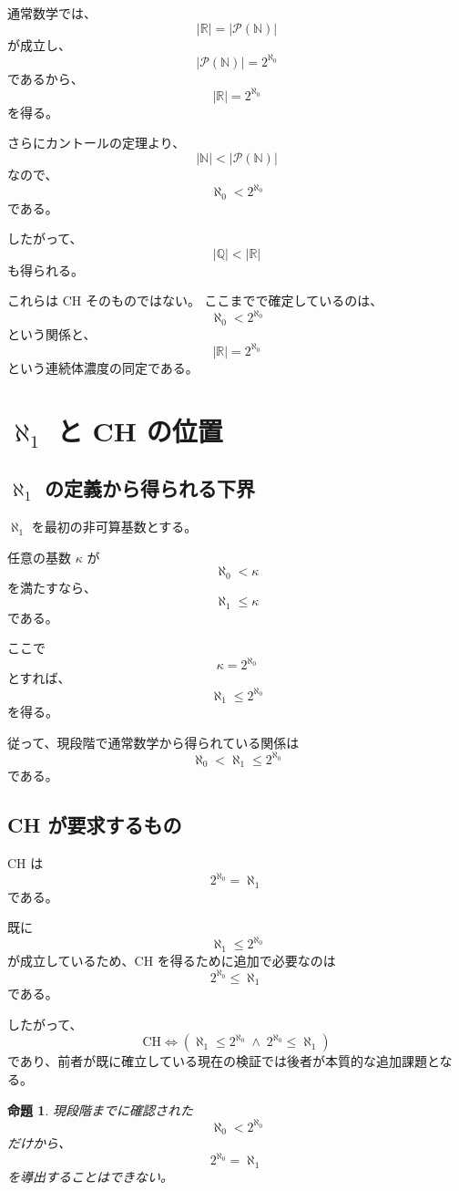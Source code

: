 \documentclass[a4paper,11pt]{article}
\newtheorem{proposition}[definition]{命題}
\newcommand{\N}{\mathbb{N}}
\newcommand{\Q}{\mathbb{Q}}
\newcommand{\R}{\mathbb{R}}
\newcommand{\Pow}{\mathcal{P}}
\begin{document}
通常数学では、
\[
|\R|=|\Pow(\N)|
\]
が成立し、
\[
|\Pow(\N)|=2^{\aleph_0}
\]
であるから、
\[
\boxed{
|\R|=2^{\aleph_0}
}
\]
を得る。

さらにカントールの定理より、
\[
|\N|<|\Pow(\N)|
\]
なので、
\[
\boxed{
\aleph_0<2^{\aleph_0}
}
\]
である。

したがって、
\[
\boxed{
|\Q|<|\R|
}
\]
も得られる。

これらは CH そのものではない。
ここまでで確定しているのは、
\[
\aleph_0<2^{\aleph_0}
\]
という関係と、
\[
|\R|=2^{\aleph_0}
\]
という連続体濃度の同定である。

\section{$\aleph_1$ と CH の位置}

\subsection{$\aleph_1$ の定義から得られる下界}

$\aleph_1$ を最初の非可算基数とする。

任意の基数 $\kappa$ が
\[
\aleph_0<\kappa
\]
を満たすなら、
\[
\aleph_1\leq\kappa
\]
である。

ここで
\[
\kappa=2^{\aleph_0}
\]
とすれば、
\[
\boxed{
\aleph_1\leq2^{\aleph_0}
}
\]
を得る。

従って、現段階で通常数学から得られている関係は
\[
\boxed{
\aleph_0<\aleph_1\leq2^{\aleph_0}
}
\]
である。

\subsection{CH が要求するもの}

CH は
\[
\boxed{
2^{\aleph_0}=\aleph_1
}
\]
である。

既に
\[
\aleph_1\leq2^{\aleph_0}
\]
が成立しているため、CH を得るために追加で必要なのは
\[
\boxed{
2^{\aleph_0}\leq\aleph_1
}
\]
である。

したがって、
\[
\boxed{
\mathrm{CH}
\iff
\left(
\aleph_1\leq2^{\aleph_0}
\;\land\;
2^{\aleph_0}\leq\aleph_1
\right)
}
\]
であり、前者が既に確立している現在の検証では後者が本質的な追加課題となる。

\begin{proposition}
現段階までに確認された
\[
\aleph_0<2^{\aleph_0}
\]
だけから、
\[
2^{\aleph_0}=\aleph_1
\]
を導出することはできない。
\end{proposition}
\end{document}
